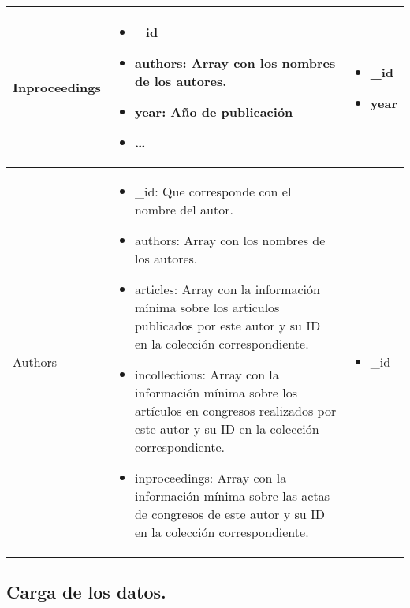 \begin{center}
\begin{tabular}{ | l | l | l |}
    Inproceedings &
    \begin{minipage}[t]{0.6\textwidth}
      \begin{itemize}
	\item \_id
	\item authors: Array con los nombres de los autores.
	\item year: Año de publicación
	\item \ldots
      \end{itemize}
    \end{minipage} & 
    \begin{minipage}[t]{0.1\textwidth}
      \begin{itemize}
	\item \_id
	\item year
      \end{itemize} 
    \end{minipage}  \\ \hline
    
    Authors &
    \begin{minipage}[t]{0.6\textwidth}
      \begin{itemize}
	\item \_id: Que corresponde con el nombre del autor.
	\item authors: Array con los nombres de los autores.
	\item articles: Array con la información mínima sobre los articulos publicados por este autor y su ID en la colección correspondiente.
	\item incollections: Array con la información mínima sobre los artículos en congresos realizados por este autor y su ID en la colección correspondiente.
	\item inproceedings: Array con la información mínima sobre las actas de congresos de este autor y su ID en la colección correspondiente.
      \end{itemize}
    \end{minipage} & 
    \begin{minipage}[t]{0.1\textwidth}
      \begin{itemize}
	\item \_id
      \end{itemize} 
    \end{minipage}  \\ \hline
  \end{tabular}
\end{center}

\subsection{Carga de los datos.}

